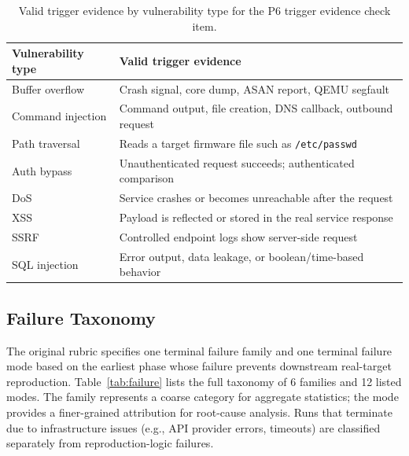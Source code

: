 \begin{table}[t]
\centering

\small
\begin{tabular}{l l}
\toprule
\textbf{Vulnerability type} & \textbf{Valid trigger evidence} \\
\midrule
Buffer overflow & Crash signal, core dump, ASAN report, QEMU segfault \\
Command injection & Command output, file creation, DNS callback, outbound request \\
Path traversal & Reads a target firmware file such as \texttt{/etc/passwd} \\
Auth bypass & Unauthenticated request succeeds; authenticated comparison \\
DoS & Service crashes or becomes unreachable after the request \\
XSS & Payload is reflected or stored in the real service response \\
SSRF & Controlled endpoint logs show server-side request \\
SQL injection & Error output, data leakage, or boolean/time-based behavior \\
\bottomrule
\end{tabular}
\caption{Valid trigger evidence by vulnerability type for the P6 trigger evidence check item.}
\label{tab:trigger}
\end{table}

\subsection{Failure Taxonomy}
\label{app:failure}

The original rubric specifies one terminal failure family and one terminal failure mode based on the earliest phase whose failure prevents downstream real-target reproduction. Table~\ref{tab:failure} lists the full taxonomy of 6 families and 12 listed modes. The family represents a coarse category for aggregate statistics; the mode provides a finer-grained attribution for root-cause analysis. Runs that terminate due to infrastructure issues (e.g., API provider errors, timeouts) are classified separately from reproduction-logic failures.

